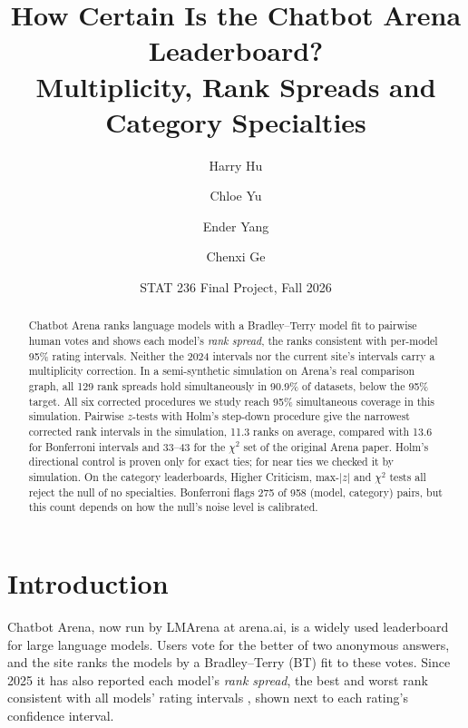 \documentclass[12pt]{article}
\title{\vspace{-1.6em}How Certain Is the Chatbot Arena Leaderboard?\\[0.2em]
\large Multiplicity, Rank Spreads and Category Specialties}
\author{Harry Hu \and Chloe Yu \and Ender Yang \and Chenxi Ge}
\date{\vspace{-0.4em}STAT 236 Final Project, Fall 2026}
\begin{document}
\maketitle

\begin{abstract}
\noindent Chatbot Arena ranks language models with a Bradley--Terry model fit to pairwise human votes and shows each model's \emph{rank spread}, the ranks consistent with per-model 95\% rating intervals. Neither the 2024 intervals nor the current site's intervals carry a multiplicity correction. In a semi-synthetic simulation on Arena's real comparison graph, all 129 rank spreads hold simultaneously in 90.9\% of datasets, below the 95\% target. All six corrected procedures we study reach 95\% simultaneous coverage in this simulation. Pairwise $z$-tests with Holm's step-down procedure give the narrowest corrected rank intervals in the simulation, 11.3 ranks on average, compared with 13.6 for Bonferroni intervals and 33--43 for the $\chi^2$ set of the original Arena paper. Holm's directional control is proven only for exact ties; for near ties we checked it by simulation. On the category leaderboards, Higher Criticism, max-$|z|$ and $\chi^2$ tests all reject the null of no specialties. Bonferroni flags 275 of 958 (model, category) pairs, but this count depends on how the null's noise level is calibrated.
\end{abstract}

\section{Introduction}\label{sec:intro}

Chatbot Arena, now run by LMArena at arena.ai, is a widely used leaderboard for large language models. Users vote for the better of two anonymous answers, and the site ranks the models by a Bradley--Terry (BT) fit \citep{bradley1952rank} to these votes. Since 2025 it has also reported each model's \emph{rank spread}, the best and worst rank consistent with all models' rating intervals \citep{lmarena2025ranking}, shown next to each rating's confidence interval.
\end{document}
